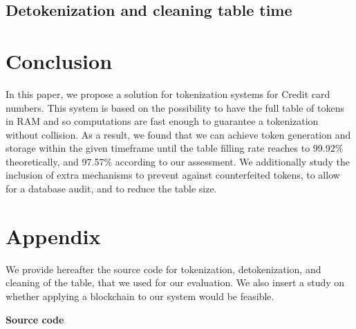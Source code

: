 \documentclass{llncs}
\newcounter{prob}
\begin{document}
\subsection{Detokenization and cleaning table time}

\section{Conclusion}\label{sect:conclu}
In this paper, we propose a solution for tokenization systems for Credit card numbers. This system is based on the possibility to have the full table of tokens in RAM and so computations are fast enough to guarantee a tokenization without collision. As a result, we found that we can achieve token generation and storage within the given timeframe until the table filling rate reaches to 99.92\% theoretically, and 97.57\% according to our assessment.
We additionally study the inclusion of extra mechanisms to prevent against counterfeited tokens, to allow for a database audit, and to reduce the table size.


\section*{Appendix}\label{appendix:code}

We provide hereafter the source code for tokenization, detokenization, and cleaning of the table, that we used for our evaluation. We also insert a study on whether applying a blockchain to our system would be feasible.

\textbf{Source code}
\end{document}

